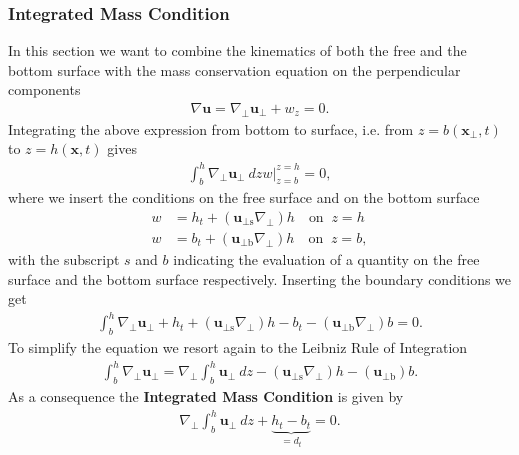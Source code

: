 \subsubsection{Integrated Mass Condition}
In this section we want to combine the kinematics of both the free and the
bottom surface with the mass conservation equation on the perpendicular
components
\begin{align}
    \nabla \mathbf{u} = \nabla_\perp \mathbf{u}_\perp + w_z = 0 .
\end{align}
Integrating the above expression from bottom to surface, i.e. from
$z=b(\mathbf{x}_\perp,t)$ to $z = h (\mathbf{x},t)$ gives
\begin{align}
    \int_b^h \nabla_\perp \mathbf{u}_\perp\ dz  w\bigg|_{z=b}^{z=h} = 0,
\end{align}
where we insert the conditions on the free surface and on the bottom surface
\begin{align}
    w &= h_t + (\mathbf{u}_{\perp \text{s}} \nabla_\perp) h \quad
    \text{on}\;\; z = h\\
    w &= b_t + (\mathbf{u}_{\perp \text{b}} \nabla_\perp) h \quad
    \text{on}\;\; z =b,
\end{align}
with the subscript $s$ and $b$ indicating the evaluation of a quantity
on the free surface and the bottom surface respectively. Inserting the
boundary conditions we get
\begin{align}
    \int_b^h \nabla_\perp \mathbf{u}_\perp
    + h_t + (\mathbf{u}_{\perp \text{s}} \nabla_\perp) h
    - b_t - (\mathbf{u}_{\perp \text{b}} \nabla_\perp) b= 0.
\end{align}
To simplify the equation we resort again to the Leibniz Rule of Integration
\begin{align}
     \int_b^h \nabla_\perp\mathbf{u}_\perp =
    \nabla_\perp \int_b^h \mathbf{u}_\perp\ dz - (\mathbf{u}_{\perp \text{s}}
    \nabla_\perp)h - (\mathbf{u}_{\perp \text{b}})b.
\end{align}
As a consequence the \textbf{Integrated Mass Condition} is given by
\begin{align}
    \nabla_\perp \int_b^h \mathbf{u}_\perp\ dz  + \underbrace{h_t -
    b_t}_{=d_t} = 0.
\end{align}
